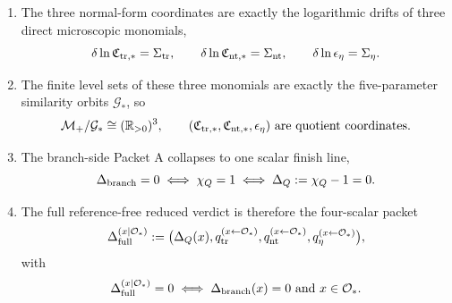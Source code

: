 \begin{theorem}
\begin{enumerate}[leftmargin=2.2em]
  \begin{equation}
  \label{eq:app-part05-theorem-triangular}
  \Theta_1=-C_{\rm tr}\Sigma_{\rm tr},
  \qquad
  \Xi_1=A_{\rm tr}\Sigma_{\rm tr}+\Sigma_{\rm nt},
  \qquad
  \mathcal R_1+\Xi_1=-\frac{\epsilon_\eta}{1-\epsilon_\eta}\Sigma_\eta.
  \end{equation}
  \item The three normal-form coordinates are exactly the logarithmic drifts of three direct microscopic monomials,
  \begin{equation}
  \label{eq:app-part05-theorem-monomials}
  \delta\ln\mathfrak C_{{\rm tr},*}=\Sigma_{\rm tr},
  \qquad
  \delta\ln\mathfrak C_{{\rm nt},*}=\Sigma_{\rm nt},
  \qquad
  \delta\ln\epsilon_\eta=\Sigma_\eta.
  \end{equation}
  \item The finite level sets of these three monomials are exactly the five-parameter similarity orbits \(\mathcal G_*\), so
  \begin{equation}
  \label{eq:app-part05-theorem-quotient}
  \mathcal M_+/\mathcal G_*
  \cong
  (\mathbb R_{>0})^3,
  \qquad
  (\mathfrak C_{{\rm tr},*},\mathfrak C_{{\rm nt},*},\epsilon_\eta)
  \text{ are quotient coordinates.}
  \end{equation}
  \item The branch-side Packet A collapses to one scalar finish line,
  \begin{equation}
  \label{eq:app-part05-theorem-packetA}
  \Delta_{\rm branch}=0
  \iff
  \chi_Q=1
  \iff
  \Delta_Q:=\chi_Q-1=0.
  \end{equation}
  \item The full reference-free reduced verdict is therefore the four-scalar packet
  \begin{equation}
  \label{eq:app-part05-theorem-finalpacket}
  \Delta_{\rm full}^{(x\mid\mathcal O_*)}
  :=
  \bigl(
  \Delta_Q(x),
  q_{\rm tr}^{(x\leftarrow\mathcal O_*)},
  q_{\rm nt}^{(x\leftarrow\mathcal O_*)},
  q_\eta^{(x\leftarrow\mathcal O_*)}
  \bigr),
  \end{equation}
  with
  \begin{equation}
  \label{eq:app-part05-theorem-finalzero}
  \Delta_{\rm full}^{(x\mid\mathcal O_*)}=0
  \iff
  \Delta_{\rm branch}(x)=0
  \text{ and }
  x\in\mathcal O_*.
  \end{equation}
\end{enumerate}
\end{theorem}

